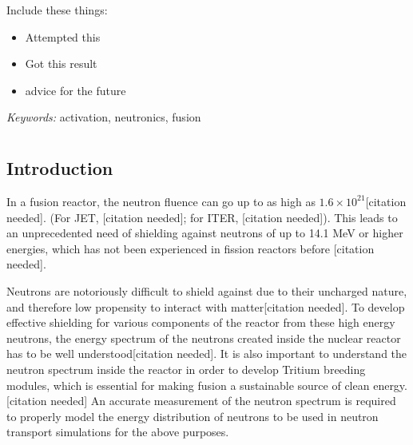 \documentclass[a4paper, 12pt]{article}
\begin{document}
\abstract
Include these things:
\begin{itemize}
    \item Attempted this
    \item Got this result
    \item advice for the future
\end{itemize}
\emph{Keywords:} activation, neutronics, fusion
\pagebreak
\tableofcontents
\listoffigures
\pagebreak


\chapter{}
\section{Introduction}
    

In a fusion reactor, the neutron fluence can go up to as high as $1.6 \times 10^{21}$[citation needed]. (For JET, [citation needed]; for ITER, [citation needed]). This leads to an unprecedented need of shielding against neutrons of up to 14.1 MeV or higher energies, which has not been experienced in fission reactors before [citation needed].

Neutrons are notoriously difficult to shield against due to their uncharged nature, and therefore low propensity to interact with matter[citation needed]. To develop effective shielding for various components of the reactor from these high energy neutrons, the energy spectrum of the neutrons created inside the nuclear reactor has to be well understood[citation needed]. It is also important to understand the neutron spectrum inside the reactor in order to develop Tritium breeding modules, which is essential for making fusion a sustainable source of clean energy. [citation needed]
An accurate measurement of the neutron spectrum is required to properly model the energy distribution of neutrons to be used in neutron transport simulations for the above purposes.
\end{document}
